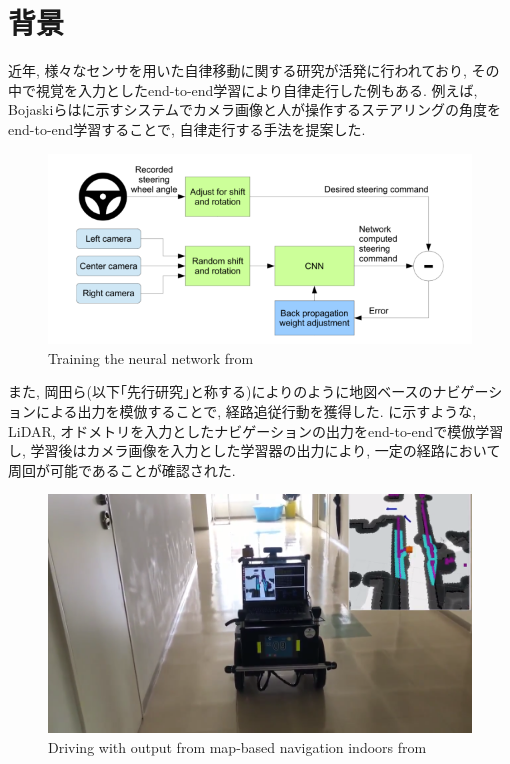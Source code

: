 
\section{背景}
近年, 様々なセンサを用いた自律移動に関する研究が活発に行われており, その中で視覚を入力としたend-to-end学習により自律走行した例もある. 例えば, Bojaskiらはに示すシステムでカメラ画像と人が操作するステアリングの角度をend-to-end学習することで, 自律走行する手法を提案した\cite{bojaski}.

\begin{figure}[hbtp]
\centering
\includegraphics[keepaspectratio, scale=0.5]
{images/bojaski.png}
\caption{Training the neural network from \cite{bojaski}}
\label{Fig:bojaski}
\end{figure}

\newpage
また, 岡田ら(以下｢先行研究｣と称する)によりのように地図ベースのナビゲーションによる出力を模倣することで, 経路追従行動を獲得した\cite{okada-si}. に示すような, LiDAR, オドメトリを入力としたナビゲーションの出力をend-to-endで模倣学習し, 学習後はカメラ画像を入力とした学習器の出力により, 一定の経路において周回が可能であることが確認された. 

\begin{figure}[h]
     \centering
     \includegraphics[keepaspectratio, scale=0.15]
     {images/tsudanuma18.png}
     \caption{Driving with output from map-based navigation indoors from \cite{okada-si}}
     \label{Fig:tsudanuma18}
     \end{figure}

